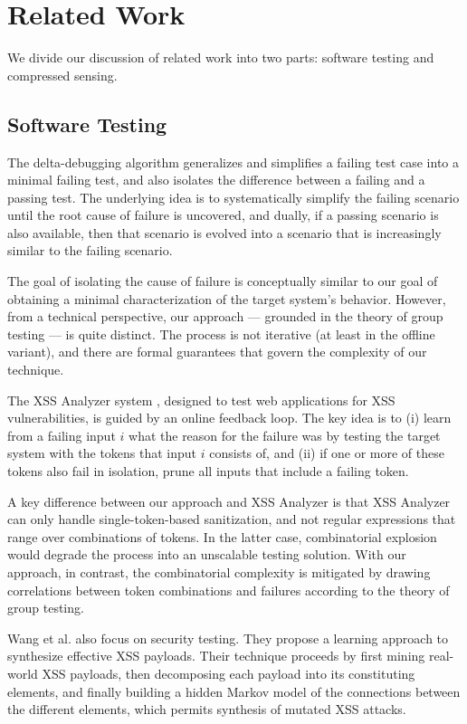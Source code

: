 \section{Related Work}

We divide our discussion of related work into two parts: software testing and compressed sensing.

\subsection{Software Testing} 

The delta-debugging algorithm \cite{DeltaDebugging:2000,DeltaDebugging:2002} generalizes and simplifies a failing test case into a minimal failing test, and also isolates the difference between a failing and a passing test. The underlying idea is to systematically simplify the failing scenario until the root cause of failure is uncovered, and dually, if a passing scenario is also available, then that scenario is evolved into a scenario that is increasingly similar to the failing scenario.

The goal of isolating the cause of failure is conceptually similar to our goal of obtaining a minimal characterization of the target system's behavior. However, from a technical perspective, our approach --- grounded in the theory of group testing --- is quite distinct. The process is not iterative (at least in the offline variant), and there are formal guarantees that govern the complexity of our technique.

The XSS Analyzer system \cite{TrippIssta:2013}, designed to test web applications for XSS vulnerabilities, is guided by an online feedback loop. The key idea is to (i) learn from a failing input $i$ what the reason for the failure was by testing the target system with the tokens that input $i$ consists of, and (ii) if one or more of these tokens also fail in isolation, prune all inputs that include a failing token.

A key difference between our approach and XSS Analyzer is that XSS Analyzer can only handle single-token-based sanitization, and not regular expressions that range over combinations of tokens. In the latter case, combinatorial explosion would degrade the process into an unscalable testing solution. With our approach, in contrast, the combinatorial complexity is mitigated by drawing correlations between token combinations and failures according to the theory of group testing.

Wang et al. \cite{YH-Wang:2010} also focus on security testing. They propose a learning approach to synthesize effective XSS payloads. Their technique proceeds by first mining real-world XSS payloads, then decomposing each payload into its constituting elements,
and finally building a hidden Markov model of the connections between the different elements, which permits synthesis of mutated XSS attacks.

